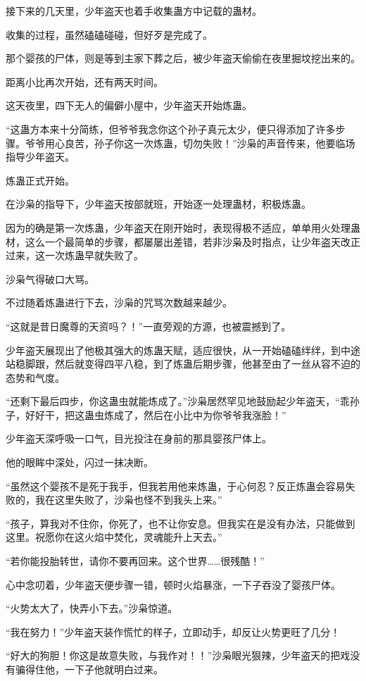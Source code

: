 \begin{this_body}
接下来的几天里，少年盗天也着手收集蛊方中记载的蛊材。

收集的过程，虽然磕磕碰碰，但好歹是完成了。

那个婴孩的尸体，则是等到主家下葬之后，被少年盗天偷偷在夜里掘坟挖出来的。

距离小比再次开始，还有两天时间。

这天夜里，四下无人的偏僻小屋中，少年盗天开始炼蛊。

“这蛊方本来十分简练，但爷爷我念你这个孙子真元太少，便只得添加了许多步骤。爷爷用心良苦，孙子你这一次炼蛊，切勿失败！”沙枭的声音传来，他要临场指导少年盗天。

炼蛊正式开始。

在沙枭的指导下，少年盗天按部就班，开始逐一处理蛊材，积极炼蛊。

因为的确是第一次炼蛊，少年盗天在刚开始时，表现得极不适应，单单用火处理蛊材，这么一个最简单的步骤，都屡屡出差错，若非沙枭及时指点，让少年盗天改正过来，这一次炼蛊早就失败了。

沙枭气得破口大骂。

不过随着炼蛊进行下去，沙枭的咒骂次数越来越少。

“这就是昔日魔尊的天资吗？！”一直旁观的方源，也被震撼到了。

少年盗天展现出了他极其强大的炼蛊天赋，适应很快，从一开始磕磕绊绊，到中途站稳脚跟，然后就变得四平八稳，到了炼蛊后期步骤，他甚至由了一丝从容不迫的态势和气度。

“还剩下最后四步，你这蛊虫就能炼成了。”沙枭居然罕见地鼓励起少年盗天，“乖孙子，好好干，把这蛊虫炼成了，然后在小比中为你爷爷我涨脸！”

少年盗天深呼吸一口气，目光投注在身前的那具婴孩尸体上。

他的眼眸中深处，闪过一抹决断。

“虽然这个婴孩不是死于我手，但我若用他来炼蛊，于心何忍？反正炼蛊会容易失败的，我在这里失败了，沙枭也怪不到我头上来。”

“孩子，算我对不住你，你死了，也不让你安息。但我实在是没有办法，只能做到这里。祝愿你在这火焰中焚化，灵魂能升上天去。”

“若你能投胎转世，请你不要再回来。这个世界……很残酷！”

心中念叨着，少年盗天便步骤一错，顿时火焰暴涨，一下子吞没了婴孩尸体。

“火势太大了，快弄小下去。”沙枭惊道。

“我在努力！”少年盗天装作慌忙的样子，立即动手，却反让火势更旺了几分！

“好大的狗胆！你这是故意失败，与我作对！！”沙枭眼光狠辣，少年盗天的把戏没有骗得住他，一下子他就明白过来。

\end{this_body}

